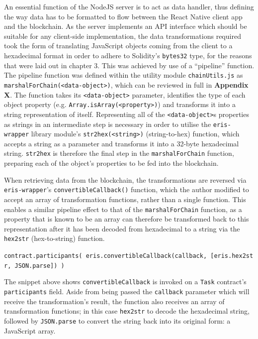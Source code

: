 \documentclass[12pt]{report}
\begin{document}
An essential function of the NodeJS server is to act as data handler,
thus defining the way data has to be formatted to flow between the React
Native client app and the blockchain. As the server implements an API
interface which should be suitable for any client-side implementation,
the data transformations required took the form of translating
JavaScript objects coming from the client to a hexadecimal format in
order to adhere to Solidity's \texttt{bytes32} type, for the reasons
that were laid out in chapter 3. This was achieved by use of a
``pipeline'' function.\\
The pipeline function was defined within the utility module
\texttt{chainUtils.js} as
\texttt{marshalForChain(\textless{}data-object\textgreater{})}, which
can be reviewed in full in \textbf{Appendix X}. The function takes its
\texttt{\textless{}data-object\textgreater{}} parameter, identifies the
type of each object property (e.g.
\texttt{Array.isArray(\textless{}property\textgreater{})}) and
transforms it into a string representation of itself. Representing all
of the \texttt{\textless{}data-object\textgreater{}}s properties as
strings in an intermediate step is necessary in order to utilise the
\texttt{eris-wrapper} library module's
\texttt{str2hex(\textless{}string\textgreater{})} (string-to-hex)
function, which accepts a string as a parameter and transforms it into a
32-byte hexadecimal string. \texttt{str2hex} is therefore the final step
in the \texttt{marshalForChain} function, preparing each of the object's
properties to be fed into the blockchain.

When retrieving data from the blockchain, the transformations are
reversed via \texttt{eris-wrapper}'s \texttt{convertibleCallback()}
function, which the author modified to accept an array of transformation
functions, rather than a single function. This enables a similar
pipeline effect to that of the \texttt{marshalForChain} function, as a
property that is known to be an array can therefore be transformed back
to this representation after it has been decoded from hexadecimal to a
string via the \texttt{hex2str} (hex-to-string) function.

\texttt{contract.participants(\ eris.convertibleCallback(callback,\ {[}eris.hex2str,\ JSON.parse{]})\ )}

The snippet above shows \texttt{convertibleCallback} is invoked on a
\texttt{Task} contract's \texttt{participants} field. Aside from being
passed the \texttt{callback} parameter which will receive the
transformation's result, the function also receives an array of
transformation functions; in this case \texttt{hex2str} to decode the
hexadecimal string, followed by \texttt{JSON.parse} to convert the
string back into its original form: a JavaScript array.
\end{document}
